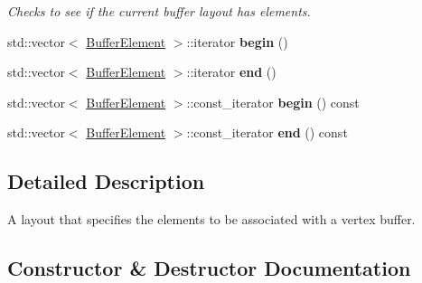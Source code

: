 \begin{DoxyCompactItemize}
\begin{DoxyCompactList}\small\item\em Checks to see if the current buffer layout has elements. \end{DoxyCompactList}\item 
\mbox{\label{classengine_1_1renderer_1_1BufferLayout_a8256cfd10160a6fe261a21a81a9a588d}} 
std\+::vector$<$ \hyperlink{structengine_1_1renderer_1_1BufferElement}{Buffer\+Element} $>$\+::iterator {\bfseries begin} ()
\item 
\mbox{\label{classengine_1_1renderer_1_1BufferLayout_a10e0aeab4adbb50e425d84bfd3b753a2}} 
std\+::vector$<$ \hyperlink{structengine_1_1renderer_1_1BufferElement}{Buffer\+Element} $>$\+::iterator {\bfseries end} ()
\item 
\mbox{\label{classengine_1_1renderer_1_1BufferLayout_adfdc4811ffe5cf1e917d72794538454d}} 
std\+::vector$<$ \hyperlink{structengine_1_1renderer_1_1BufferElement}{Buffer\+Element} $>$\+::const\+\_\+iterator {\bfseries begin} () const
\item 
\mbox{\label{classengine_1_1renderer_1_1BufferLayout_a53d9791c80e8cef3ffbe9788a88a5986}} 
std\+::vector$<$ \hyperlink{structengine_1_1renderer_1_1BufferElement}{Buffer\+Element} $>$\+::const\+\_\+iterator {\bfseries end} () const
\end{DoxyCompactItemize}


\subsection{Detailed Description}
A layout that specifies the elements to be associated with a vertex buffer. 

\subsection{Constructor \& Destructor Documentation}
\mbox{\label{classengine_1_1renderer_1_1BufferLayout_aad7d69ca7a55c528fd619bc2f51635f0}} 

